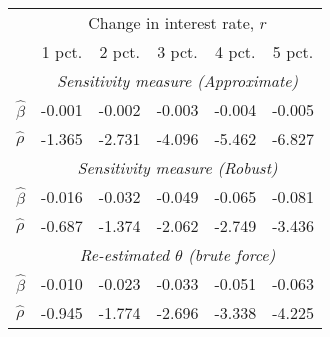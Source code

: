 \begin{tabular}{l*{5}{c}} \toprule 
& \multicolumn{5}{c}{ Change in interest rate, $r$ } \\ \cmidrule(lr){2-6}  
& 1 pct. & 2 pct. & 3 pct. & 4 pct. & 5 pct. \\ \midrule 
& \multicolumn{5}{c}{ \emph{Sensitivity measure (Approximate)} } \\ \cmidrule(lr){2-6}  
 $\hat{\beta}$ & -0.001 & -0.002 & -0.003 & -0.004 & -0.005 \\
 $\hat{\rho}$ & -1.365 & -2.731 & -4.096 & -5.462 & -6.827 \\\cmidrule(lr){2-6}  
& \multicolumn{5}{c}{ \emph{Sensitivity measure (Robust)} } \\ \cmidrule(lr){2-6}  
 $\hat{\beta}$ & -0.016 & -0.032 & -0.049 & -0.065 & -0.081 \\
 $\hat{\rho}$ & -0.687 & -1.374 & -2.062 & -2.749 & -3.436 \\\cmidrule(lr){2-6}  
& \multicolumn{5}{c}{ \emph{Re-estimated $\theta$ (brute force)} } \\ \cmidrule(lr){2-6}  
 $\hat{\beta}$ & -0.010 & -0.023 & -0.033 & -0.051 & -0.063 \\ 
 $\hat{\rho}$  & -0.945  & -1.774  & -2.696  & -3.338  & -4.225 \\ \bottomrule  \end{tabular} 
